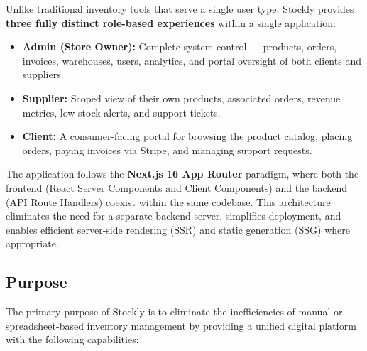 \documentclass[12pt,onecolumn]{IEEEtran}
\begin{document}
\begin{tcolorbox}[infobox,title={Three-Role Architecture}]
Unlike traditional inventory tools that serve a single user type, Stockly provides \textbf{three fully distinct role-based experiences} within a single application:
\begin{itemize}[leftmargin=1.5em]
  \item \textbf{Admin (Store Owner):} Complete system control --- products, orders, invoices, warehouses, users, analytics, and portal oversight of both clients and suppliers.
  \item \textbf{Supplier:} Scoped view of their own products, associated orders, revenue metrics, low-stock alerts, and support tickets.
  \item \textbf{Client:} A consumer-facing portal for browsing the product catalog, placing orders, paying invoices via Stripe, and managing support requests.
\end{itemize}
\end{tcolorbox}

The application follows the \textbf{Next.js 16 App Router} paradigm, where both the frontend (React Server Components and Client Components) and the backend (API Route Handlers) coexist within the same codebase. This architecture eliminates the need for a separate backend server, simplifies deployment, and enables efficient server-side rendering (SSR) and static generation (SSG) where appropriate.

\subsection{Purpose}

The primary purpose of Stockly is to eliminate the inefficiencies of manual or spreadsheet-based inventory management by providing a unified digital platform with the following capabilities:
\end{document}
